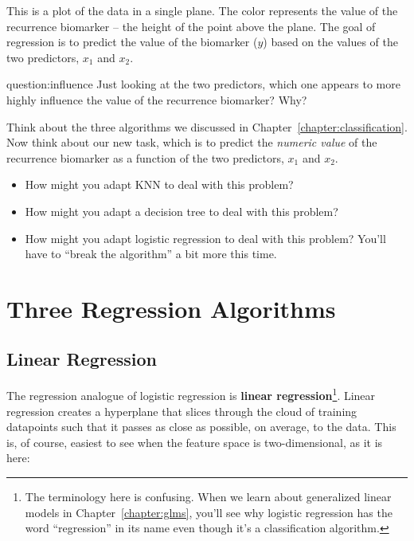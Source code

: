 This is a plot of the data in a single plane. The color represents the value of the recurrence biomarker -- the height of the point above the plane. The goal of regression is to predict the value of the biomarker ($y$) based on the values of the two predictors, $x_1$ and $x_2$.
\vspace{5mm} 

\begin{question}{question:influence}
Just looking at the two predictors, which one appears to more highly influence the value of the recurrence biomarker? Why?
\end{question}

\begin{question}{}
Think about the three algorithms we discussed in Chapter~\ref{chapter:classification}. Now think about our new task, which is to predict the \emph{numeric value} of the recurrence biomarker as a function of the two predictors, $x_1$ and $x_2$. 
\begin{itemize}
\item How might you adapt KNN to deal with this problem?
\item How might you adapt a decision tree to deal with this problem?
\item How might you adapt logistic regression to deal with this problem? You'll have to ``break the algorithm'' a bit more this time.  
\end{itemize}
\end{question}


\section{Three Regression Algorithms}

\subsection{Linear Regression \label{ssect:linreg}}

The regression analogue of logistic regression is \textbf{linear regression}\footnote{The terminology here is confusing. When we learn about generalized linear models in Chapter~\ref{chapter:glms}, you'll see why logistic regression has the word ``regression'' in its name even though it's a classification algorithm.}. Linear regression creates a hyperplane that slices through the cloud of training datapoints such that it passes as close as possible, on average, to the data. This is, of course, easiest to see when the feature space is two-dimensional, as it is here:

